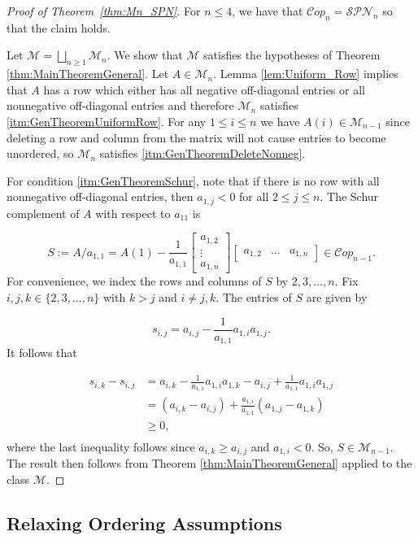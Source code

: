 \documentclass{amsart}
\newcommand{\cM}{\mathcal{M}}
\newcommand{\Cop}{\mathcal{C}op}
\newcommand{\SPN}{\mathcal{SPN}}
\theoremstyle{definition}
\begin{document}
\begin{proof}[Proof of Theorem~\ref{thm:Mn_SPN}]
For $n \leq 4$, we have that $\Cop_n = \SPN_n$ so that the claim holds. 

Let $\cM = \bigsqcup_{n\geq 1} \cM_n$. We show that $\cM$ satisfies the hypotheses of Theorem \ref{thm:MainTheoremGeneral}. Let $A \in \cM_n$.  Lemma \ref{lem:Uniform_Row} implies that $A$ has a row which either has all negative off-diagonal entries or all nonnegative off-diagonal entries and therefore $\cM_n$ satisfies \ref{itm:GenTheoremUniformRow}. 
For any $1\leq i\leq n$ we have $A(i) \in \cM_{n-1}$ since deleting a row and column from the matrix will not cause entries to become unordered, so $\cM_n$ satisfies \ref{itm:GenTheoremDeleteNonneg}.

For condition \ref{itm:GenTheoremSchur}, note that if there is no row with all nonnegative off-diagonal entries, then $a_{1,j} < 0 $ for all $2 \leq j \leq n$. The Schur complement of $A$ with respect to $a_{11}$ is

\[S:= A/a_{1,1} = A(1) - \frac{1}{a_{1,1}}\begin{bmatrix} a_{1,2} \\ \vdots \\ a_{1,n}\end{bmatrix}\begin{bmatrix} a_{1,2} & \dots & a_{1,n}\end{bmatrix} \in \Cop_{n-1}.\]
%
For convenience, we index the rows and columns of $S$ by $2,3, \dots, n$. Fix $i,j,k \in \{2,3,\ldots, n\}$ with $k > j$ and $i\neq j,k$. The entries of $S$ are given by 

\[s_{i,j} = a_{i,j} - \frac{1}{a_{1,1}}a_{1,i}a_{1,j}.\]
%
It follows that 

\[\begin{aligned}
s_{i,k} - s_{i,j} &= a_{i,k} - \frac{1}{a_{1,1}}a_{1,i}a_{1,k} - a_{i,j} + \frac{1}{a_{1,1}}a_{1,i}a_{1,j}\\
&= \left(a_{i,k} - a_{i,j}\right) + \frac{a_{1,i}}{a_{1,1}}(a_{1,j} - a_{1,k})\\
&\geq 0,\\
\end{aligned}\]
%
where the last inequality follows since $a_{i,k}\geq a_{i,j}$ and $a_{1,i} < 0$. So, $S \in \cM_{n-1}$. The result then follows from Theorem \ref{thm:MainTheoremGeneral} applied to the class $\cM$. \end{proof}


\subsection{Relaxing Ordering Assumptions}\label{sec:MainTheoremBlock}
\end{document}
